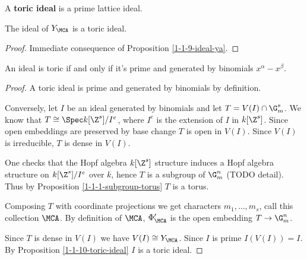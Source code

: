 \begin{definition}
  \label{1-1-10-toric-ideal}
  \leanok
  A {\bf toric ideal} is a prime lattice ideal.
\end{definition}


\begin{proposition}
  \label{1-1-10-toric-ideal}

  The ideal of $Y_\MCA$ is a toric ideal.
\end{proposition}
\begin{proof}

  Immediate consequence of Proposition \ref{1-1-9-ideal-ya}.
\end{proof}


\begin{proposition}
  \label{1-1-11-toric-ideal-gen-binomial}

  An ideal is toric if and only if it's prime and generated by binomials $x^\alpha - x^\beta$.
\end{proposition}
\begin{proof}

  A toric ideal is prime and generated by binomials by definition.

  Conversely, let $I$ be an ideal generated by binomials and let $T = V(I) \cap \G_m^s$. We know that
  $T\cong \Spec k[\Z^s] / I^e$, where $I^e$ is the extension of $I$ in $k[\Z^s]$. Since open
  embeddings are preserved by base change $T$ is open in $V(I)$. Since $V(I)$ is irreducible,
  $T$ is dense in $V(I)$.

  One checks that the Hopf algebra $k[\Z^s]$ structure induces a Hopf algebra structure
  on $k[\Z^s] / I^e$ over $k$, hence $T$ is a subgroup of $\G_m^n$ (TODO detail). Thus by
  Proposition \ref{1-1-1-subgroup-torus} $T$ is a torus.

  Composing $T$ with coordinate projections we get characters $m_1,\dots,m_s$, call this collection $\MCA$.
  By definition of $\MCA$, $\Phi'_\MCA$ is the open embedding $T \to \G_m^n$.

  Since $T$ is dense in $V(I)$ we have $V(I) \cong Y_\MCA$. Since $I$ is prime $I(V(I)) = I$. By
  Proposition \ref{1-1-10-toric-ideal} $I$ is a toric ideal.
\end{proof}


